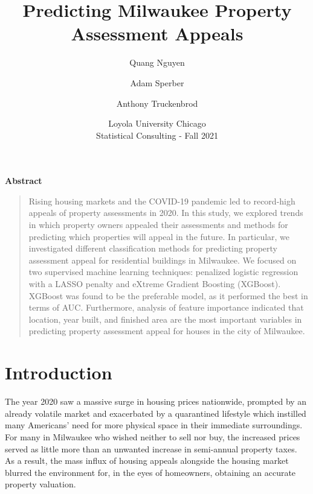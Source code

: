 \documentclass[
  12pt,
]{article}
\title{Predicting Milwaukee Property Assessment Appeals}
\author{Quang Nguyen \and Adam Sperber \and Anthony Truckenbrod}
\date{\vspace{-2mm} Loyola University Chicago \\ \vspace{6mm} Statistical Consulting - Fall 2021}
\begin{document}
\maketitle

\begin{center}

\small

\textbf{Abstract}

\end{center}

\vspace{-8mm}

\small

\onehalfspacing

\begin{quote}
Rising housing markets and the COVID-19 pandemic led to record-high
appeals of property assessments in 2020. In this study, we explored
trends in which property owners appealed their assessments and methods
for predicting which properties will appeal in the future. In
particular, we investigated different classification methods for
predicting property assessment appeal for residential buildings in
Milwaukee. We focused on two supervised machine learning techniques:
penalized logistic regression with a LASSO penalty and eXtreme Gradient
Boosting (XGBoost). XGBoost was found to be the preferable model, as it
performed the best in terms of AUC. Furthermore, analysis of feature
importance indicated that location, year built, and finished area are
the most important variables in predicting property assessment appeal
for houses in the city of Milwaukee.
\end{quote}

\normalsize

\newpage

\doublespacing

\hypertarget{introduction}{%
\section{Introduction}\label{introduction}}

The year 2020 saw a massive surge in housing prices nationwide, prompted
by an already volatile market and exacerbated by a quarantined lifestyle
which instilled many Americans' need for more physical space in their
immediate surroundings. For many in Milwaukee who wished neither to sell
nor buy, the increased prices served as little more than an unwanted
increase in semi-annual property taxes. As a result, the mass influx of
housing appeals alongside the housing market blurred the environment
for, in the eyes of homeowners, obtaining an accurate property
valuation.
\end{document}
